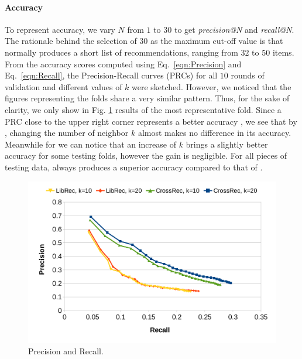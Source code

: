\paragraph{\textbf{Accuracy}} To represent accuracy, we vary $N$ from $1$ to $30$ to get \emph{precision@N} and \emph{recall@N}. The rationale behind the selection of $30$ as the maximum cut-off value is that \LR normally produces a short list of recommendations, ranging from $32$ to $50$ items. From the accuracy scores computed using Eq.~\eqref{eqn:Precision} and Eq.~\eqref{eqn:Recall}, the Precision-Recall curves (PRCs) for all $10$ rounds of validation and different values of $k$ were sketched. However, we noticed that the figures representing the folds share a very similar pattern.  Thus, for the sake of clarity, we only show in Fig. \ref{fig:PrecisionRecall} results of the most representative fold. Since a PRC close to the upper right corner represents a better accuracy \cite{DiNoia:2012:LOD:2362499.2362501}, we see that by \LR, changing the number of neighbor $k$ almost makes no difference in its accuracy. Meanwhile for \CR we can notice that an increase of $k$ brings a slightly better accuracy for some testing folds, however the gain is negligible. For all pieces of testing data, \CR always produces a superior accuracy compared to that of \LR.%

\begin{figure}[h!]
	\centering
	\vspace{-.4cm}
	\includegraphics[width=0.86\linewidth]{figs/PrecisionRecall_Fold6.pdf}
	\vspace{-.7cm}
	\caption{Precision and Recall.}
	\label{fig:PrecisionRecall}
	\vspace{-.5cm}
\end{figure}






